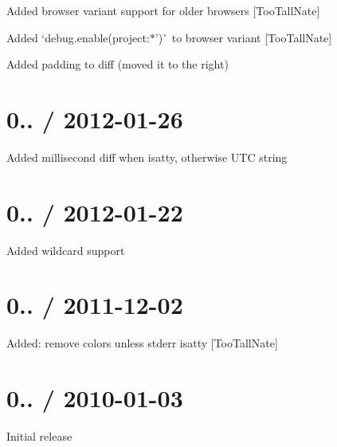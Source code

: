 \begin{DoxyItemize}
\item Added browser variant support for older browsers \mbox{[}Too\+Tall\+Nate\mbox{]}
\item Added `debug.\+enable(\textquotesingle{}project\+:$\ast$')\`{} to browser variant \mbox{[}Too\+Tall\+Nate\mbox{]}
\item Added padding to diff (moved it to the right)
\end{DoxyItemize}

\section*{0.. / 2012-\/01-\/26 }


\begin{DoxyItemize}
\item Added millisecond diff when isatty, otherwise U\+TC string
\end{DoxyItemize}

\section*{0.. / 2012-\/01-\/22 }


\begin{DoxyItemize}
\item Added wildcard support
\end{DoxyItemize}

\section*{0.. / 2011-\/12-\/02 }


\begin{DoxyItemize}
\item Added\+: remove colors unless stderr isatty \mbox{[}Too\+Tall\+Nate\mbox{]}
\end{DoxyItemize}

\section*{0.. / 2010-\/01-\/03 }


\begin{DoxyItemize}
\item Initial release 
\end{DoxyItemize}